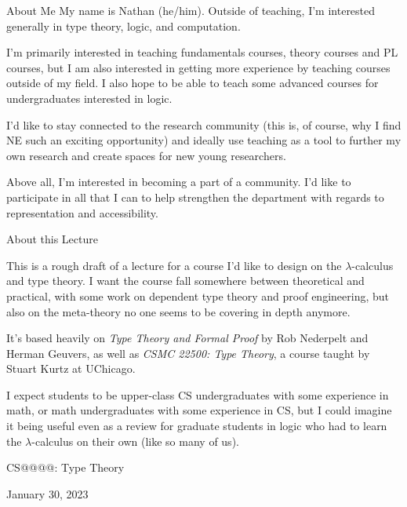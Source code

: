 \documentclass[10pt]{beamer}
\begin{document}
\begin{frame}{About Me}
My name is Nathan (he/him). Outside of teaching, I'm interested generally in type theory, logic, and computation.
\nxt

I'm primarily interested in teaching fundamentals courses, theory courses and PL courses, but I am also interested in getting more experience by teaching courses outside of my field. I also hope to be able to teach some advanced courses for undergraduates interested in logic.
\nxt

I'd like to stay connected to the research community (this is, of course, why I find NE such an exciting opportunity) and ideally use teaching as a tool to further my own research and create spaces for new young researchers.
\nxt

Above all, I'm interested in becoming a part of a community. I'd like to participate in all that I can to help strengthen the department with regards to representation and accessibility.
\end{frame}

\begin{frame}{About this Lecture}

This is a rough draft of a lecture for a course I'd like to design on the $\lambda$-calculus and type theory.
I want the course fall somewhere between theoretical and practical, with some work on dependent type theory and proof engineering, but also on the meta-theory no one seems to be covering in depth anymore.
\nxt

It's based heavily on \textit{Type Theory and Formal Proof} by Rob Nederpelt and Herman Geuvers, as well as \textit{CSMC 22500: Type Theory}, a course taught by Stuart Kurtz at UChicago.
\nxt

I expect students to be upper-class CS undergraduates with some experience in math, or math undergraduates with some experience in CS, but I could imagine it being useful even as a review for graduate students in logic who had to learn the $\lambda$-calculus on their own (like so many of us).
\end{frame}

\begin{frame}


CS@@@@: Type Theory

January 30, 2023


\end{frame}
\end{document}
